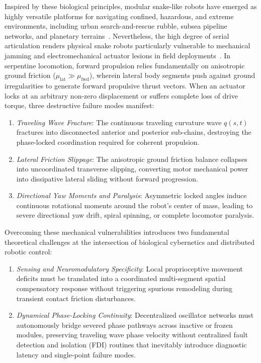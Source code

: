 \documentclass{iopjournal}
\begin{document}
Inspired by these biological principles, modular snake-like robots have emerged as highly versatile platforms for navigating confined, hazardous, and extreme environments, including urban search-and-rescue rubble, subsea pipeline networks, and planetary terrains~\cite{transeth2009,liljeback2012,wright2012,crespi2008}. Nevertheless, the high degree of serial articulation renders physical snake robots particularly vulnerable to mechanical jamming and electromechanical actuator lesions in field deployments~\cite{schmucker2022,elsayed2021,sartoretti2019}. In serpentine locomotion, forward propulsion relies fundamentally on anisotropic ground friction ($\mu_{\text{lat}} \gg \mu_{\text{fwd}}$), wherein lateral body segments push against ground irregularities to generate forward propulsive thrust vectors. When an actuator locks at an arbitrary non-zero displacement or suffers complete loss of drive torque, three destructive failure modes manifest:
\begin{enumerate}[label=(\alph*)]
  \item \textit{Traveling Wave Fracture}: The continuous traveling curvature wave $q(s, t)$ fractures into disconnected anterior and posterior sub-chains, destroying the phase-locked coordination required for coherent propulsion.
  \item \textit{Lateral Friction Slippage}: The anisotropic ground friction balance collapses into uncoordinated transverse slipping, converting motor mechanical power into dissipative lateral sliding without forward progression.
  \item \textit{Directional Yaw Moments and Paralysis}: Asymmetric locked angles induce continuous rotational moments around the robot's center of mass, leading to severe directional yaw drift, spiral spinning, or complete locomotor paralysis.
\end{enumerate}

Overcoming these mechanical vulnerabilities introduces two fundamental theoretical challenges at the intersection of biological cybernetics and distributed robotic control:
\begin{enumerate}[label=(\roman*)]
  \item \textit{Sensing and Neuromodulatory Specificity}: Local proprioceptive movement deficits must be translated into a coordinated multi-segment spatial compensatory response without triggering spurious remodeling during transient contact friction disturbances.
  \item \textit{Dynamical Phase-Locking Continuity}: Decentralized oscillator networks must autonomously bridge severed phase pathways across inactive or frozen modules, preserving traveling wave phase velocity without centralized fault detection and isolation (FDI) routines that inevitably introduce diagnostic latency and single-point failure modes.
\end{enumerate}
\end{document}
